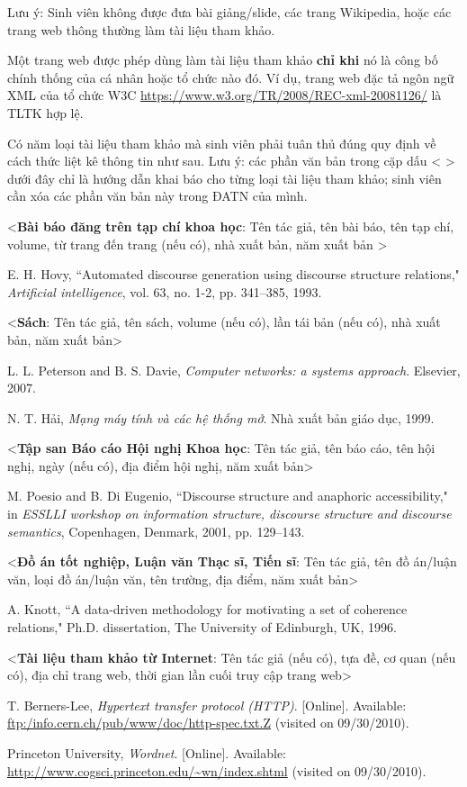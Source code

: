 \documentclass[../DoAn.tex]{subfiles}
\begin{document}
Lưu ý: Sinh viên không được đưa bài giảng/slide, các trang Wikipedia, hoặc các trang web thông thường làm tài liệu tham khảo. 

Một trang web được phép dùng làm tài liệu tham khảo \textbf{chỉ khi} nó là công bố chính thống của cá nhân hoặc tổ chức nào đó. Ví dụ, trang web đặc tả ngôn ngữ XML của tổ chức W3C \url{https://www.w3.org/TR/2008/REC-xml-20081126/} là TLTK hợp lệ.

Có năm loại tài liệu tham khảo mà sinh viên phải tuân thủ đúng quy định về cách thức liệt kê thông tin như sau. Lưu ý: các phần văn bản trong cặp dấu < > dưới đây chỉ là hướng dẫn khai báo cho từng loại tài liệu tham khảo; sinh viên cần xóa các phần văn bản này trong ĐATN của mình.

<\textbf{Bài báo đăng trên tạp chí khoa học}: Tên tác giả, tên bài báo, tên tạp chí, volume, từ trang đến trang (nếu có), nhà xuất bản, năm xuất bản >



E. H. Hovy, ``Automated discourse generation using discourse structure relations," \textit{Artificial intelligence}, vol. 63, no. 1-2, pp. 341–385, 1993.

<\textbf{Sách}: Tên tác giả, tên sách, volume (nếu có), lần tái bản (nếu có), nhà xuất bản, năm xuất bản>

L. L. Peterson and B. S. Davie, \textit{Computer networks: a systems approach}. Elsevier, 2007.

N. T. Hải, \textit{Mạng máy tính và các hệ thống mở}. Nhà xuất bản giáo dục, 1999. 

<\textbf{Tập san Báo cáo Hội nghị Khoa học}: Tên tác giả, tên báo cáo, tên hội nghị, ngày (nếu có), địa điểm hội nghị, năm xuất bản>

M. Poesio and B. Di Eugenio, ``Discourse structure and anaphoric accessibility," in \textit{ESSLLI workshop on information structure, discourse structure and discourse semantics}, Copenhagen, Denmark, 2001, pp. 129–143.

<\textbf{Đồ án tốt nghiệp, Luận văn Thạc sĩ, Tiến sĩ}: Tên tác giả, tên đồ án/luận văn, loại đồ án/luận văn, tên trường, địa điểm, năm xuất bản>

A. Knott, ``A data-driven methodology for motivating a set of coherence relations," Ph.D. dissertation, The University of Edinburgh, UK, 1996.

<\textbf{Tài liệu tham khảo từ Internet}: Tên tác giả (nếu có), tựa đề, cơ quan (nếu có), địa chỉ trang web, thời gian lần cuối truy cập trang web>

T. Berners-Lee, \textit{Hypertext transfer protocol (HTTP)}. [Online]. Available: \url{ftp:/info.cern.ch/pub/www/doc/http-spec.txt.Z} (visited on 09/30/2010).

Princeton University, \textit{Wordnet}. [Online]. Available: \url{http://www.cogsci.princeton.edu/~wn/index.shtml} (visited on 09/30/2010).
\end{document}
